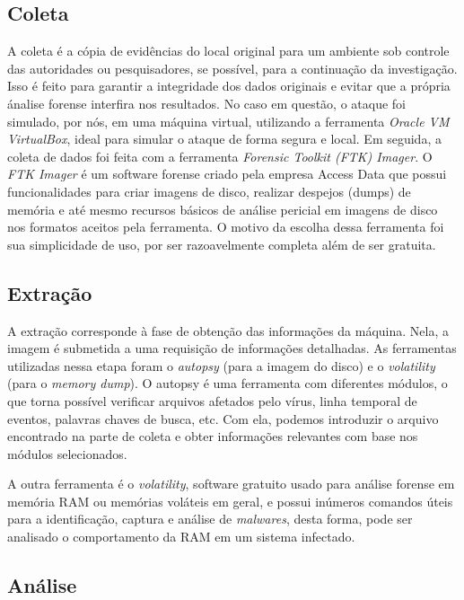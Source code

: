 \documentclass[12pt]{article}
\begin{document}
\subsection{Coleta}

A coleta é a cópia de evidências do local original para um ambiente sob controle das autoridades ou pesquisadores, se possível, para a continuação da investigação. Isso é feito para garantir a integridade dos dados originais e evitar que a própria ánalise forense interfira nos resultados.
No caso em questão, o ataque foi simulado, por nós, em uma máquina virtual, utilizando a ferramenta \textit{Oracle VM VirtualBox}, ideal para simular o ataque de forma segura e local. Em seguida, a coleta de dados foi feita com a ferramenta\textit{ Forensic Toolkit (FTK) Imager}. O\textit{ FTK Imager} é um software forense criado pela empresa Access Data que possui funcionalidades para criar imagens de disco, realizar despejos (dumps) de memória e até mesmo recursos básicos de análise pericial em imagens de disco nos formatos aceitos pela ferramenta. O motivo da escolha dessa ferramenta foi sua simplicidade de uso, por ser razoavelmente completa além de ser gratuita.

\subsection{Extração}

A extração corresponde à fase de obtenção das informações da máquina. Nela, a imagem é submetida a uma requisição de informações detalhadas. As ferramentas utilizadas nessa etapa foram o \textit{autopsy} (para a imagem do disco) e o \textit{volatility} (para o \textit{memory dump}). O autopsy é uma ferramenta com diferentes módulos, o que torna possível verificar arquivos afetados pelo vírus, linha temporal de eventos, palavras chaves de busca, etc. Com ela, podemos introduzir o arquivo encontrado na parte de coleta e obter informações relevantes com base nos módulos selecionados.

A outra ferramenta é o \textit{volatility}, software gratuito usado para análise forense em memória RAM ou memórias voláteis em geral, e possui inúmeros comandos úteis para a identificação, captura e análise de \textit{malwares}, desta forma, pode ser analisado o comportamento da RAM em um sistema infectado.

\subsection{Análise}
\end{document}
